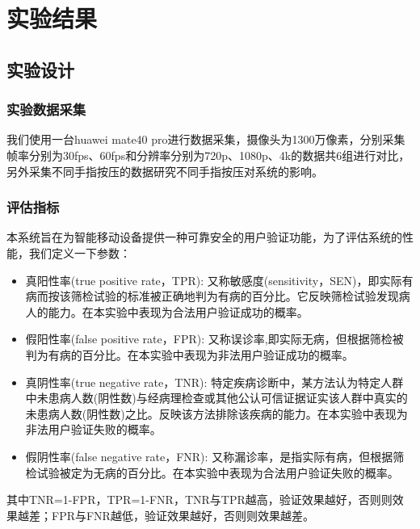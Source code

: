 %
%
%
%
%
%

\chapter{实验结果}
\section{实验设计}
\subsection{实验数据采集}
{我们使用一台huawei mate40 pro进行数据采集，摄像头为1300万像素，分别采集帧率分别为30fps、60fps和分辨率分别为720p、1080p、4k的数据共6组进行对比，另外采集不同手指按压的数据研究不同手指按压对系统的影响。}

\par
\subsection{评估指标}
{本系统旨在为智能移动设备提供一种可靠安全的用户验证功能，为了评估系统的性能，我们定义一下参数：}
\begin{itemize}
    \item {真阳性率(true positive rate，TPR):} {又称敏感度(sensitivity，SEN)，即实际有病而按该筛检试验的标准被正确地判为有病的百分比。它反映筛检试验发现病人的能力。在本实验中表现为合法用户验证成功的概率。}
    \item {假阳性率(false positive rate，FPR):} {又称误诊率,即实际无病，但根据筛检被判为有病的百分比。在本实验中表现为非法用户验证成功的概率。}
    \item {真阴性率(true negative rate，TNR):} {特定疾病诊断中，某方法认为特定人群中未患病人数(阴性数)与经病理检查或其他公认可信证据证实该人群中真实的未患病人数(阴性数)之比。反映该方法排除该疾病的能力。在本实验中表现为非法用户验证失败的概率。}
    \item {假阴性率(false negative rate，FNR):} {又称漏诊率，是指实际有病，但根据筛检试验被定为无病的百分比。在本实验中表现为合法用户验证失败的概率。}
\end{itemize}
{其中TNR=1-FPR，TPR=1-FNR，TNR与TPR越高，验证效果越好，否则则效果越差；FPR与FNR越低，验证效果越好，否则则效果越差。}
\par
